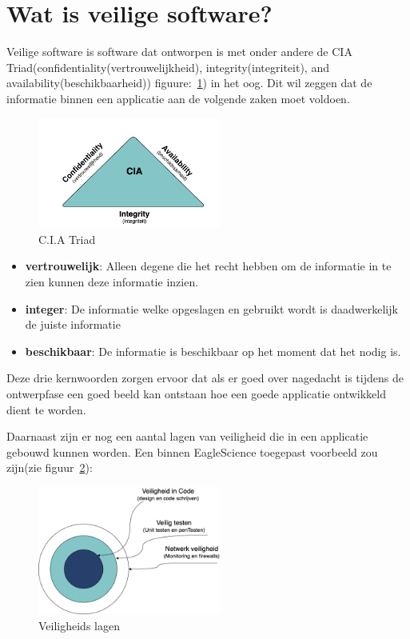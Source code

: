 

\section{Wat is veilige software?}
Veilige software is software dat ontworpen is met onder andere de CIA Triad(confidentiality(vertrouwelijkheid), integrity(integriteit), and availability(beschikbaarheid)) figuure:~\ref{fig:CIA}) in het oog. Dit wil zeggen dat de informatie binnen een applicatie aan de volgende zaken moet voldoen.
\begin{figure}[H]
    \centering
    \includegraphics[width=6cm]{gfx/CIA}
    \caption{C.I.A Triad}
    \label{fig:CIA}
\end{figure}

\begin{itemize}
    \item \textbf{vertrouwelijk}: Alleen degene die het recht hebben om de informatie in te zien kunnen deze informatie inzien.
    \item \textbf{integer}: De informatie welke opgeslagen en gebruikt wordt is daadwerkelijk de juiste informatie
    \item \textbf{beschikbaar}: De informatie is beschikbaar op het moment dat het nodig is.
\end{itemize}
Deze drie kernwoorden zorgen ervoor dat als er goed over nagedacht is tijdens de ontwerpfase een goed beeld kan ontstaan hoe een goede applicatie ontwikkeld dient te worden.

Daarnaast zijn er nog een aantal lagen van veiligheid die in een applicatie gebouwd kunnen worden.
Een binnen EagleScience toegepast voorbeeld zou zijn(zie figuur~\ref{fig:veiligheidslagen}):

\begin{figure}[H]
    \centering
    \includegraphics[width=6cm]{gfx/veiligheids lagen}
    \caption{Veiligheids lagen}
    \label{fig:veiligheidslagen}
\end{figure}

